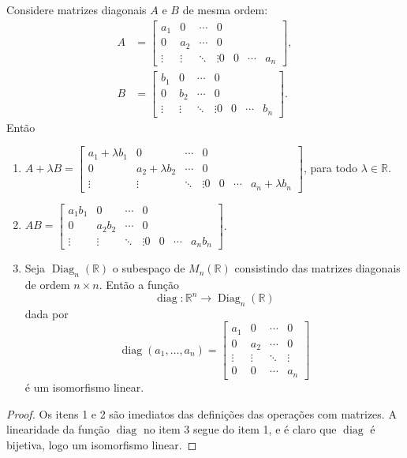 \begin{theorem}
	Considere matrizes diagonais $A$ e $B$ de mesma ordem:
	\begin{align*}A&=\begin{bmatrix}
		a_{1}&0&\cdots&0\\
		0&a_{2}&\cdots&0\\
		\vdots&\vdots&\ddots&\vdots
		0&0&\cdots&a_{n}
		\end{bmatrix},\\
		B&=\begin{bmatrix}
		b_{1}&0&\cdots&0\\
		0&b_{2}&\cdots&0\\
		\vdots&\vdots&\ddots&\vdots
		0&0&\cdots&b_{n}
		\end{bmatrix}.\end{align*}
	Então
	\begin{enumerate}
		\item $A+\lambda B=\begin{bmatrix}
		a_1+\lambda b_{1}&0&\cdots&0\\
		0&a_2+\lambda b_{2}&\cdots&0\\
		\vdots&\vdots&\ddots&\vdots
		0&0&\cdots&a_n+\lambda b_{n}
		\end{bmatrix}$, para todo $\lambda\in\mathbb{R}$.
		\item $AB=\begin{bmatrix}
		a_1b_{1}&0&\cdots&0\\
		0&a_2b_{2}&\cdots&0\\
		\vdots&\vdots&\ddots&\vdots
		0&0&\cdots&a_nb_{n}
		\end{bmatrix}$.
		\item Seja $\operatorname{Diag}_n(\mathbb{R})$ o subespaço de $M_n(\mathbb{R})$ consistindo das matrizes diagonais de ordem $n\times n$. Então a função
		\[\operatorname{diag}\colon\mathbb{R}^n\to\operatorname{Diag}_n(\mathbb{R})\]
		dada por
		\[\operatorname{diag}(a_1,\ldots,a_n)=\begin{bmatrix}a_1&0&\cdots&0\\
		0&a_2&\cdots&0\\\vdots&\vdots&\ddots&\vdots\\0&0&\cdots&a_n\end{bmatrix}\]
		é um isomorfismo linear.
	\end{enumerate}
\end{theorem}

\begin{proof}
	Os itens 1 e 2 são imediatos das definições das operações com matrizes. A linearidade da função $\operatorname{diag}$ no item 3 segue do item 1, e é claro que $\operatorname{diag}$ é bijetiva, logo um isomorfismo linear.
\end{proof}